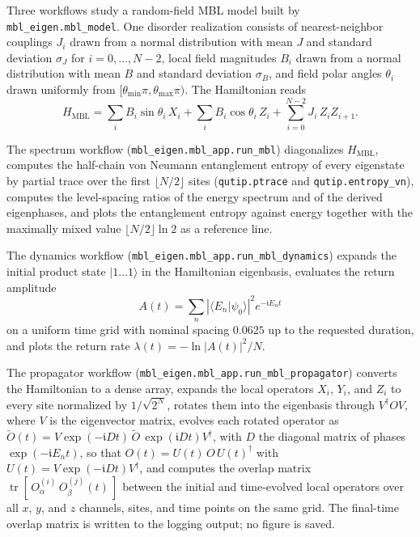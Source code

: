 \documentclass[longbibliography]{revtex4-2}
\newcommand{\im}[0]{\mathfrak{i}}
\begin{document}
Three workflows study a random-field MBL model built by
\texttt{mbl\_eigen.mbl\_model}. One disorder realization consists of
nearest-neighbor couplings $J_i$ drawn from a normal distribution with
mean $J$ and standard deviation $\sigma_J$ for $i = 0, \dots, N-2$,
local field magnitudes $B_i$ drawn from a normal distribution with mean
$B$ and standard deviation $\sigma_B$, and field polar angles $\theta_i$
drawn uniformly from $[\theta_{\min}\pi, \theta_{\max}\pi)$. The
Hamiltonian reads
\begin{equation}\label{eq:hmbl}
    H_{\mathrm{MBL}}
    = \sum_{i} B_{i}\sin\theta_{i}\, X_{i}
    + \sum_{i} B_{i}\cos\theta_{i}\, Z_{i}
    + \sum_{i=0}^{N-2} J_{i}\, Z_{i} Z_{i+1}.
\end{equation}

The spectrum workflow (\texttt{mbl\_eigen.mbl\_app.run\_mbl})
diagonalizes $H_{\mathrm{MBL}}$, computes the half-chain von Neumann
entanglement entropy of every eigenstate by partial trace over the first
$\lfloor N/2 \rfloor$ sites (\texttt{qutip.ptrace} and
\texttt{qutip.entropy\_vn}), computes the level-spacing ratios of the
energy spectrum and of the derived eigenphases, and plots the
entanglement entropy against energy together with the maximally mixed
value $\lfloor N/2 \rfloor \ln 2$ as a reference line.

The dynamics workflow (\texttt{mbl\_eigen.mbl\_app.run\_mbl\_dynamics})
expands the initial product state $|1 \ldots 1\rangle$ in the Hamiltonian
eigenbasis, evaluates the return amplitude
\begin{equation}\label{eq:return-amplitude}
    A(t) = \sum_{n} \left| \langle E_n | \psi_0 \rangle \right|^{2}
    e^{-\im E_n t}
\end{equation}
on a uniform time grid with nominal spacing $0.0625$ up to the requested
duration, and plots the return rate
$\lambda(t) = -\ln|A(t)|^{2}/N$.

The propagator workflow
(\texttt{mbl\_eigen.mbl\_app.run\_mbl\_propagator}) converts the
Hamiltonian to a dense array, expands the local operators $X_i$, $Y_i$,
and $Z_i$ to every site normalized by $1/\sqrt{2^{N}}$, rotates them
into the eigenbasis through $V^{\dagger} O V$, where $V$ is the
eigenvector matrix, evolves each rotated operator as
$\tilde{O}(t) = V \exp(-\im D t)\, \tilde{O}\, \exp(\im D t)
V^{\dagger}$, with $D$ the diagonal matrix of phases $\exp(-\im E_n t)$,
so that $O(t) = U(t)\, O\, U(t)^{\dagger}$ with
$U(t) = V \exp(-\im D t) V^{\dagger}$, and computes the overlap matrix
$\operatorname{tr}\!\left[\, O_{\alpha}^{(i)}\, O_{\beta}^{(j)}(t)
\,\right]$ between the initial and time-evolved local operators over all
$x$, $y$, and $z$ channels, sites, and time points on the same grid. The
final-time overlap matrix is written to the logging output; no figure is
saved.
\end{document}
